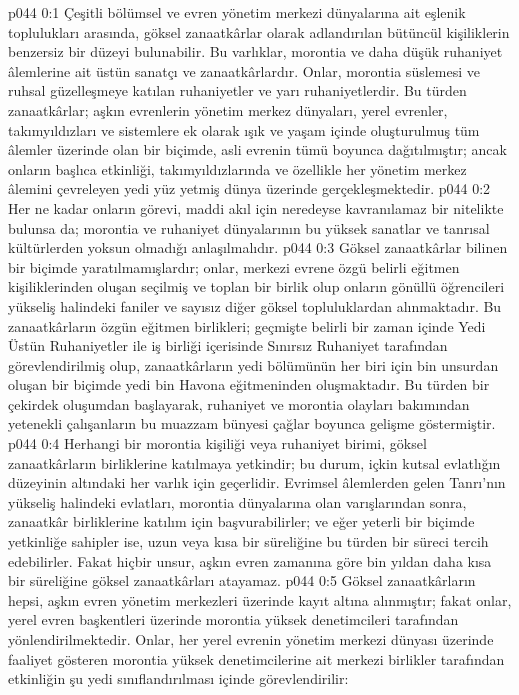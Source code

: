 \vs p044 0:1 Çeşitli bölümsel ve evren yönetim merkezi dünyalarına ait eşlenik toplulukları arasında, göksel zanaatkârlar olarak adlandırılan bütüncül kişiliklerin benzersiz bir düzeyi bulunabilir. Bu varlıklar, morontia ve daha düşük ruhaniyet âlemlerine ait üstün sanatçı ve zanaatkârlardır. Onlar, morontia süslemesi ve ruhsal güzelleşmeye katılan ruhaniyetler ve yarı ruhaniyetlerdir. Bu türden zanaatkârlar; aşkın evrenlerin yönetim merkez dünyaları, yerel evrenler, takımyıldızları ve sistemlere ek olarak ışık ve yaşam içinde oluşturulmuş tüm âlemler üzerinde olan bir biçimde, asli evrenin tümü boyunca dağıtılmıştır; ancak onların başlıca etkinliği, takımyıldızlarında ve özellikle her yönetim merkez âlemini çevreleyen yedi yüz yetmiş dünya üzerinde gerçekleşmektedir.
\vs p044 0:2 Her ne kadar onların görevi, maddi akıl için neredeyse kavranılamaz bir nitelikte bulunsa da; morontia ve ruhaniyet dünyalarının bu yüksek sanatlar ve tanrısal kültürlerden yoksun olmadığı anlaşılmalıdır.
\vs p044 0:3 Göksel zanaatkârlar bilinen bir biçimde yaratılmamışlardır; onlar, merkezi evrene özgü belirli eğitmen kişiliklerinden oluşan seçilmiş ve toplan bir birlik olup onların gönüllü öğrencileri yükseliş halindeki faniler ve sayısız diğer göksel topluluklardan alınmaktadır. Bu zanaatkârların özgün eğitmen birlikleri; geçmişte belirli bir zaman içinde Yedi Üstün Ruhaniyetler ile iş birliği içerisinde Sınırsız Ruhaniyet tarafından görevlendirilmiş olup, zanaatkârların yedi bölümünün her biri için bin unsurdan oluşan bir biçimde yedi bin Havona eğitmeninden oluşmaktadır. Bu türden bir çekirdek oluşumdan başlayarak, ruhaniyet ve morontia olayları bakımından yetenekli çalışanların bu muazzam bünyesi çağlar boyunca gelişme göstermiştir.
\vs p044 0:4 Herhangi bir morontia kişiliği veya ruhaniyet birimi, göksel zanaatkârların birliklerine katılmaya yetkindir; bu durum, içkin kutsal evlatlığın düzeyinin altındaki her varlık için geçerlidir. Evrimsel âlemlerden gelen Tanrı’nın yükseliş halindeki evlatları, morontia dünyalarına olan varışlarından sonra, zanaatkâr birliklerine katılım için başvurabilirler; ve eğer yeterli bir biçimde yetkinliğe sahipler ise, uzun veya kısa bir süreliğine bu türden bir süreci tercih edebilirler. Fakat hiçbir unsur, aşkın evren zamanına göre bin yıldan daha kısa bir süreliğine göksel zanaatkârları atayamaz.
\vs p044 0:5 Göksel zanaatkârların hepsi, aşkın evren yönetim merkezleri üzerinde kayıt altına alınmıştır; fakat onlar, yerel evren başkentleri üzerinde morontia yüksek denetimcileri tarafından yönlendirilmektedir. Onlar, her yerel evrenin yönetim merkezi dünyası üzerinde faaliyet gösteren morontia yüksek denetimcilerine ait merkezi birlikler tarafından etkinliğin şu yedi sınıflandırılması içinde görevlendirilir:
